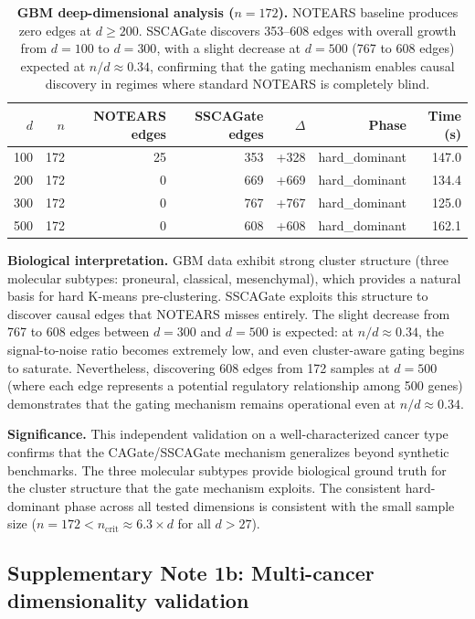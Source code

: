 \documentclass[12pt,a4paper]{article}
\begin{document}
\begin{table}[htbp]
\centering
\caption{\textbf{GBM deep-dimensional analysis ($n = 172$).}
NOTEARS baseline produces zero edges at $d \geq 200$. SSCAGate discovers
353--608 edges with overall growth from $d = 100$ to $d = 300$, with a slight decrease at $d = 500$ (767 to 608 edges) expected at $n/d \approx 0.34$, confirming
that the gating mechanism enables causal discovery in regimes where standard
NOTEARS is completely blind.}
\label{tab:note1_gbm}
\begin{tabular}{rrrrrrr}
\toprule
$d$ & $n$ & NOTEARS edges & SSCAGate edges & $\Delta$ & Phase & Time (s) \\
\midrule
100 & 172 & 25 & 353  & +328  & hard\_dominant & 147.0 \\
200 & 172 & 0  & 669  & +669  & hard\_dominant & 134.4 \\
300 & 172 & 0  & 767  & +767  & hard\_dominant & 125.0 \\
500 & 172 & 0  & 608  & +608  & hard\_dominant & 162.1 \\
\bottomrule
\end{tabular}
\end{table}

\textbf{Biological interpretation.} GBM data exhibit strong cluster structure (three
molecular subtypes: proneural, classical, mesenchymal), which provides a
natural basis for hard K-means pre-clustering. SSCAGate exploits this structure
to discover causal edges that NOTEARS misses entirely. The slight decrease from
767 to 608 edges between $d = 300$ and $d = 500$ is expected: at $n/d \approx 0.34$,
the signal-to-noise ratio becomes extremely low, and even cluster-aware gating
begins to saturate. Nevertheless, discovering 608 edges from 172 samples at
$d = 500$ (where each edge represents a potential regulatory relationship among
500 genes) demonstrates that the gating mechanism remains operational even at $n/d \approx 0.34$.

\textbf{Significance.} This independent validation on a well-characterized
cancer type confirms that the CAGate/SSCAGate mechanism generalizes beyond
synthetic benchmarks. The three molecular subtypes provide biological ground
truth for the cluster structure that the gate mechanism exploits. The
consistent hard-dominant phase across all tested dimensions is consistent with
the small sample size ($n = 172 < n_{\text{crit}} \approx 6.3 \times d$ for all
$d > 27$).

\subsection{Supplementary Note 1b: Multi-cancer dimensionality validation}
\label{sec:note1b}
\end{document}
